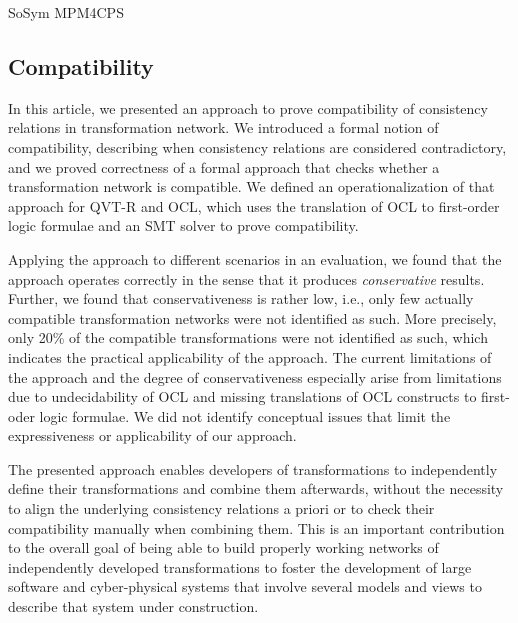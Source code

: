 \begin{copiedFrom}{SoSym MPM4CPS}

\subsection{Compatibility}

In this article, we presented an approach to prove compatibility of consistency relations in transformation network.
We introduced a formal notion of compatibility, describing when consistency relations are considered contradictory, and we proved correctness of a formal approach that checks whether a transformation network is compatible.
We defined an operationalization of that approach for QVT-R and OCL, which uses the translation of OCL to first-order logic formulae and an SMT solver to prove compatibility.

Applying the approach to different scenarios in an evaluation, we found that the approach operates correctly in the sense that it produces \emph{conservative} results.
Further, we found that conservativeness is rather low, i.e., only few actually compatible transformation networks were not identified as such.
More precisely, only 20\% of the compatible transformations were not identified as such, which indicates the practical applicability of the approach.
The current limitations of the approach and the degree of conservativeness especially arise from limitations due to undecidability of OCL and missing translations of OCL constructs to first-oder logic formulae.
We did not identify conceptual issues that limit the expressiveness or applicability of our approach.

The presented approach enables developers of transformations to independently define their transformations and combine them afterwards, without the necessity to align the underlying consistency relations a priori or to check their compatibility manually when combining them.
This is an important contribution to the overall goal of being able to build properly working networks of independently developed transformations to foster the development of large software and cyber-physical systems that involve several models and views to describe that system under construction.


\end{copiedFrom} %




